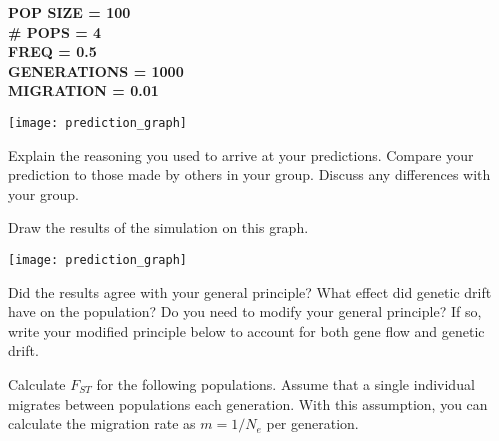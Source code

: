 \documentclass[11pt, addpoints]{exam}
\begin{document}
\begin{questions}
\ifprintanswers
	{\bfseries %
	POP SIZE = 100\\
	\# POPS = 4\\
	FREQ = 0.5\\
	GENERATIONS = 1000\\
	MIGRATION = 0.01 }\vspace*{16\baselineskip}
\else
	\begin{center}
		\texttt{[image: prediction\_graph]}
	\end{center}
\fi


\question[1]
Explain the reasoning you used to arrive at your
predictions. Compare your prediction to those made by others in your
group. Discuss any differences with your group.

\newpage

\question
Draw the results of the simulation on this graph.

\begin{center}
	\texttt{[image: prediction\_graph]}
\end{center}

\question[2]
Did the results agree with your general principle? What
effect did genetic drift have on the population? Do you need to modify
your general principle? If so, write your modified principle below to
account for both gene flow and genetic drift.

\newpage


\question[3]
Calculate $F_{ST}$ for the following
populations. Assume that a single individual migrates between
populations each generation. With this assumption, you can calculate the
migration rate as $m = 1/N_e$  per generation.


\end{questions}
\end{document}
